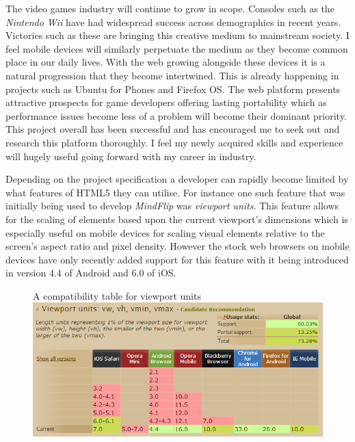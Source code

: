 \documentclass[final]{cmpreport}
\begin{document}

The video games industry will continue to grow in scope. Consoles such as the \textit{Nintendo Wii} have had widespread success across demographics in recent years. Victories such as these are bringing this creative medium to mainstream society. I feel mobile devices will similarly perpetuate the medium as they become common place in our daily lives. With the web growing alongside these devices it is a natural progression that they become intertwined. This is already happening in projects such as Ubuntu for Phones and Firefox OS. The web platform presents attractive prospects for game developers offering lasting portability which as performance issues become less of a problem will become their dominant priority. This project overall has been successful and has encouraged me to seek out and research this platform thoroughly. I feel my newly acquired skills and experience will hugely useful going forward with my career in industry.


Depending on the project specification a developer can rapidly become limited by what features of HTML5 they can utilise. For instance one such feature that was initially being used to develop \textit{MindFlip} was \textit{viewport units}. This feature allows for the scaling of elements based upon the current viewport's dimensions which is especially useful on mobile devices for scaling visual elements relative to the screen's aspect ratio and pixel density. However the stock web browsers on mobile devices have only recently added support for this feature with it being introduced in version 4.4 of Android and 6.0 of iOS.

\begin{figure}[h]{A compatibility table for viewport units \label{viewport}}
  \includegraphics[width=1.0\textwidth]{viewport-units.png}
\end{figure}
\end{document}
